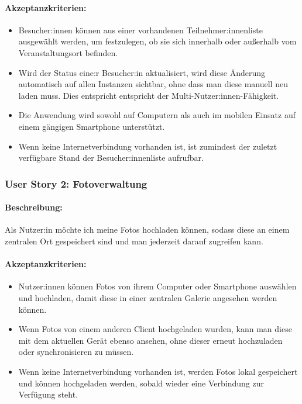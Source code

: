 \documentclass[a4paper,12pt,twoside]{scrreprt}
\begin{document}
\paragraph*{Akzeptanzkriterien:}

\begin{itemize}
    \item Besucher:innen können aus einer vorhandenen Teilnehmer:innenliste ausgewählt werden, um festzulegen, ob sie sich innerhalb oder außerhalb vom Veranstaltungsort befinden.
    \item Wird der Status eine:r Besucher:in aktualisiert, wird diese Änderung automatisch auf allen Instanzen sichtbar, ohne dass man diese manuell neu laden muss. Dies entspricht entspricht der Multi-Nutzer:innen-Fähigkeit.
    \item Die Anwendung wird sowohl auf Computern als auch im mobilen Einsatz auf einem gängigen Smartphone unterstützt.
    \item Wenn keine Internetverbindung vorhanden ist, ist zumindest der zuletzt verfügbare Stand der Besucher:innenliste aufrufbar.
\end{itemize}

\subsubsection*{User Story 2: Fotoverwaltung}
\label{sub-sub-sec:user-story-2}

\paragraph*{Beschreibung:} Als Nutzer:in möchte ich meine Fotos hochladen können, sodass diese an einem zentralen Ort gespeichert sind und man jederzeit darauf zugreifen kann.

\paragraph*{Akzeptanzkriterien:}

\begin{itemize}
    \item Nutzer:innen können Fotos von ihrem Computer oder Smartphone auswählen und hochladen, damit diese in einer zentralen Galerie angesehen werden können.
    \item Wenn Fotos von einem anderen Client hochgeladen wurden, kann man diese mit dem aktuellen Gerät ebenso ansehen, ohne dieser erneut hochzuladen oder synchronisieren zu müssen.
    \item Wenn keine Internetverbindung vorhanden ist, werden Fotos lokal gespeichert und können hochgeladen werden, sobald wieder eine Verbindung zur Verfügung steht.
\end{itemize}
\end{document}
